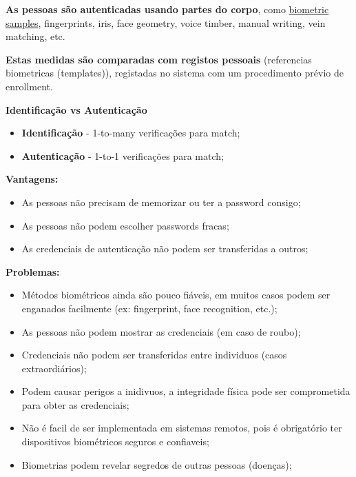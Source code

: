 \documentclass{article}
\begin{document}
\begin{flushleft}
  \textbf{As pessoas são autenticadas usando partes do corpo}, como
  \uline{biometric samples}, fingerprints, iris, face geometry,
  voice timber, manual writing, vein matching, etc.

  \vspace{2mm}

  \textbf{Estas medidas são comparadas com registos pessoais} (referencias biometricas (templates)),
  registadas no sistema com um procedimento prévio de enrollment.

  \vspace{2mm}

  \textbf{Identificação vs Autenticação}
  \begin{itemize}
    \item \textbf{Identificação} - 1-to-many verificações para match;
    \item \textbf{Autenticação} - 1-to-1 verificações para match;
  \end{itemize}
\end{flushleft}

\begin{flushleft}
  \textbf{Vantagens:}
  \begin{itemize}
    \item As pessoas não precisam de memorizar ou ter a password consigo;
    \item As pessoas não podem escolher passwords fracas;
    \item As credenciais de autenticação não podem ser transferidas a outros;
  \end{itemize}

  \vspace{2mm}

  \textbf{Problemas:}
  \begin{itemize}
    \item Métodos biométricos ainda são pouco fiáveis, em muitos casos
    podem ser enganados facilmente (ex: fingerprint, face recognition, etc.);

    \item As pessoas não podem mostrar as credenciais (em caso de roubo);
    \item Credenciais não podem ser transferidas entre individuos (casos extraordiários);
    \item Podem causar perigos a inidivuos, a integridade física pode ser comprometida para obter as credenciais;
    \item Não é facil de ser implementada em sistemas remotos, pois é obrigatório ter dispositivos biométricos seguros e confiaveis;
    \item Biometrias podem revelar segredos de outras pessoas (doenças);
  \end{itemize}
\end{flushleft}
\end{document}
